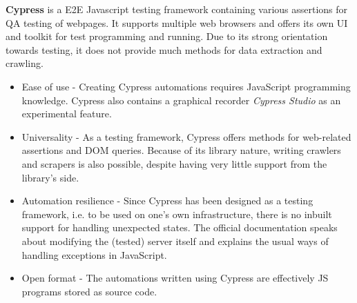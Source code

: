 \textbf{Cypress} is a \ac{E2E} Javascript testing framework containing various assertions for \ac{QA} testing of webpages.
It supports multiple web browsers and offers its own UI and toolkit for test programming and running. 
Due to its strong orientation towards testing, it does not provide much methods for data extraction and crawling.
\begin{itemize}
    \item Ease of use - Creating Cypress automations requires JavaScript programming knowledge. Cypress also contains a graphical recorder \textit{Cypress Studio} as an experimental feature.
    \item Universality - As a testing framework, Cypress offers methods for web-related assertions and \acs{DOM} queries.
    Because of its library nature, writing crawlers and scrapers is also possible, despite having very little support from the library's side.
    \item Automation resilience -
    Since Cypress has been designed as a testing framework, i.e. to be used on one's own infrastructure, there is no inbuilt support for handling unexpected states.
    The official documentation speaks about modifying the (tested) server itself and explains the usual ways of handling exceptions in JavaScript. 
    \item Open format - The automations written using Cypress are effectively JS programs stored as source code.
\end{itemize}

